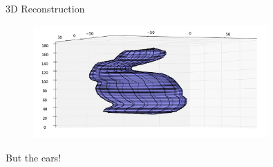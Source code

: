 \documentclass{beamer}
\begin{document}
\begin{frame}{3D Reconstruction}
    \begin{figure}[H]
      \centering
        \includegraphics[width=0.8\textwidth]{polygonal_mesh.png}
      \label{fig:f2}
    \end{figure}
\end{frame}

\begin{frame}{But the ears!}
    \begin{figure}[H]
        \begin{floatrow}
        \end{floatrow}
    \end{figure}
\end{frame}
\end{document}
